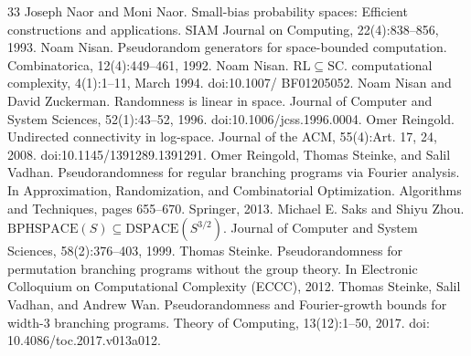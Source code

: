 \documentclass[10pt,a4paper]{article}
\begin{document}
\begin{thebibliography}{33}
 Joseph Naor and Moni Naor. Small-bias probability spaces: Efficient constructions and applications. SIAM Journal on Computing, 22(4):838–856, 1993.
 Noam Nisan. Pseudorandom generators for space-bounded computation. Combinatorica, 12(4):449–461, 1992.
 Noam Nisan. $\mathrm{RL}\subseteq\mathrm{SC}$. computational complexity, 4(1):1–11, March 1994. doi:10.1007/ BF01205052.
 Noam Nisan and David Zuckerman. Randomness is linear in space. Journal of Computer and System Sciences, 52(1):43–52, 1996. doi:10.1006/jcss.1996.0004.
 Omer Reingold. Undirected connectivity in log-space. Journal of the ACM, 55(4):Art. 17, 24, 2008. doi:10.1145/1391289.1391291.
 Omer Reingold, Thomas Steinke, and Salil Vadhan. Pseudorandomness for regular branching programs via Fourier analysis. In Approximation, Randomization, and Combinatorial Optimization. Algorithms and Techniques, pages 655–670. Springer, 2013.
 Michael E. Saks and Shiyu Zhou. $\mathrm{BPHSPACE}(S)\subseteq\mathrm{DSPACE}(S^{3/2})$. Journal of Computer and System Sciences, 58(2):376–403, 1999.
 Thomas Steinke. Pseudorandomness for permutation branching programs without the group theory. In Electronic Colloquium on Computational Complexity (ECCC), 2012.
 Thomas Steinke, Salil Vadhan, and Andrew Wan. Pseudorandomness and Fourier-growth bounds for width-3 branching programs. Theory of Computing, 13(12):1–50, 2017. doi: 10.4086/toc.2017.v013a012.
\end{thebibliography}
\end{document}
